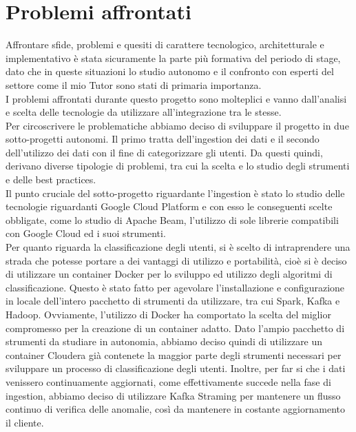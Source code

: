 \section{Problemi affrontati}
Affrontare sfide, problemi e quesiti di carattere tecnologico, architetturale e implementativo è stata sicuramente la parte più formativa del periodo di stage, dato che in queste situazioni lo studio autonomo e il confronto con esperti del settore come il mio Tutor sono stati di primaria importanza.
\\
I problemi affrontati durante questo progetto sono molteplici e vanno dall'analisi e scelta delle tecnologie da utilizzare all'integrazione tra le stesse.
\\
Per circoscrivere le problematiche abbiamo deciso di sviluppare il progetto in due sotto-progetti autonomi. 
Il primo tratta dell'ingestion dei dati e il secondo dell'utilizzo dei dati con il fine di categorizzare gli utenti. Da questi quindi, derivano diverse tipologie di problemi, tra cui la scelta e lo studio degli strumenti e delle \gls{best practices}.
\\
Il punto cruciale del sotto-progetto riguardante l'ingestion è stato lo studio delle tecnologie riguardanti Google Cloud Platform e con esso le conseguenti scelte obbligate, come lo studio di Apache Beam, l'utilizzo di sole librerie compatibili con Google Cloud ed i suoi strumenti.
\\
Per quanto riguarda la classificazione degli utenti, si è scelto di intraprendere una strada che potesse portare a dei vantaggi di utilizzo e portabilità, cioè si è deciso di utilizzare un \gls{container} Docker per lo sviluppo ed utilizzo degli algoritmi di classificazione.
Questo è stato fatto per agevolare l'installazione e configurazione in locale dell'intero pacchetto di strumenti da utilizzare, tra cui Spark, Kafka e Hadoop.
Ovviamente, l'utilizzo di Docker ha comportato la scelta del miglior compromesso per la creazione di un container adatto. Dato l'ampio pacchetto di strumenti da studiare in autonomia, abbiamo deciso quindi di utilizzare un container Cloudera \cite{containercloudera} già contenete la maggior parte degli strumenti necessari per sviluppare un processo di classificazione degli utenti.
Inoltre, per far si che i dati venissero continuamente aggiornati, come effettivamente succede nella fase di ingestion, abbiamo deciso di utilizzare Kafka Straming per mantenere un flusso continuo di verifica delle anomalie, così da mantenere in costante aggiornamento il cliente.

